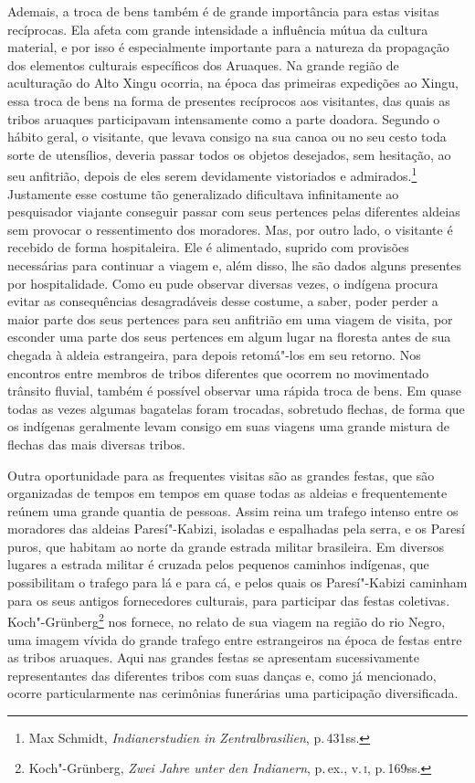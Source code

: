 Ademais, a troca de bens também é de grande importância para estas
visitas recíprocas. Ela afeta com grande intensidade a influência mútua
da cultura material, e por isso é especialmente importante para a
natureza da propagação dos elementos culturais específicos dos Aruaques.
Na grande região de aculturação do Alto Xingu ocorria, na época das
primeiras expedições ao Xingu, essa troca de bens na forma de presentes
recíprocos aos visitantes, das quais as tribos aruaques participavam
intensamente como a parte doadora. Segundo o hábito geral, o
visitante, que levava consigo na sua canoa ou no seu cesto toda sorte
de utensílios, deveria passar todos os objetos desejados, sem hesitação,
ao seu anfitrião, depois de eles serem devidamente vistoriados e
admirados.\footnote{Max Schmidt, \textit{Indianerstudien in
  Zentralbrasilien}, p.\,431ss.} Justamente esse costume tão
generalizado dificultava infinitamente ao pesquisador viajante conseguir
passar com seus pertences pelas diferentes aldeias sem provocar o
ressentimento dos moradores. Mas, por outro lado, o visitante é recebido
de forma hospitaleira. Ele é alimentado, suprido com provisões
necessárias para continuar a viagem e, além disso, lhe são dados alguns
presentes por hospitalidade. Como eu pude observar diversas vezes, o
indígena procura evitar as consequências desagradáveis desse costume, a
saber, poder perder a maior parte dos seus pertences para seu anfitrião
em uma viagem de visita, por esconder uma parte dos seus pertences em
algum lugar na floresta antes de sua chegada à aldeia estrangeira, para
depois retomá"-los em seu retorno. Nos encontros entre membros de tribos
diferentes que ocorrem no movimentado trânsito fluvial, também é
possível observar uma rápida troca de bens. Em quase todas as vezes
algumas bagatelas foram trocadas, sobretudo flechas, de forma que os
indígenas geralmente levam consigo em suas viagens uma grande mistura de
flechas das mais diversas tribos.

{Outra oportunidade para as frequentes visitas são as grandes festas,
que são organizadas de tempos em tempos em quase todas as aldeias e
frequentemente reúnem uma grande quantia de pessoas. Assim reina um
trafego intenso entre os moradores das aldeias Paresí"-Kabizi, isoladas e
espalhadas pela serra, e os Paresí puros, que habitam ao norte da grande
estrada militar brasileira. Em diversos lugares a estrada militar é
cruzada pelos pequenos caminhos indígenas, que possibilitam o trafego
para lá e para cá, e pelos quais os Paresí"-Kabizi caminham para os seus
antigos fornecedores culturais, para participar das festas coletivas.
Koch"-Grünberg\footnote{Koch"-Grünberg, \textit{Zwei Jahre unter den
  Indianern}, p.\,ex., v.\,\textsc{i}, p.\,169ss.} nos fornece, no relato de sua
viagem na região do rio Negro, uma imagem vívida do grande trafego
entre estrangeiros na época de festas entre as tribos aruaques. Aqui nas
grandes festas se apresentam sucessivamente representantes das
diferentes tribos com suas danças e, como já mencionado, ocorre
particularmente nas cerimônias funerárias uma participação
diversificada.}

